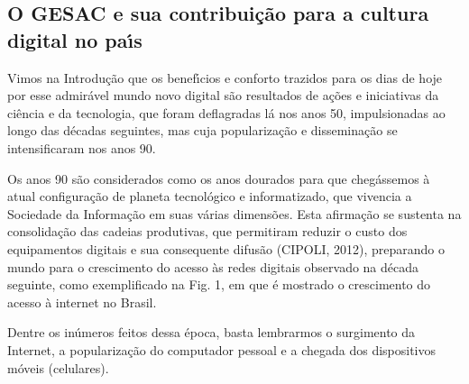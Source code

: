 \documentclass[
12pt,		%
openright,	%
twoside,  %
a4paper,			%
chapter=TITLE,		%
english,			%
french,				%
spanish,			%
brazil				%
]{USPSC-classe/USPSC}
\begin{document}
\subsection[O GESAC e sua contribui\c{c}\~ao para  a cultura  digital  no pa\'{\i}s]{O GESAC e sua contribui\c{c}\~ao para  a cultura  digital  no pa\'{\i}s}\label{O GESAC e sua contribui\c{c}\~ao para  a cultura  digital  no pa\'{\i}s}
Vimos na Introdu\c{c}\~ao que os benef\'{\i}cios e conforto trazidos para os dias de hoje por esse admir\'avel mundo novo digital s\~ao resultados de a\c{c}\~oes e iniciativas da ci\^encia e da tecnologia, que foram deflagradas l\'a nos anos 50, impulsionadas ao longo das d\'ecadas seguintes, mas cuja populariza\c{c}\~ao e dissemina\c{c}\~ao se intensificaram nos anos 90.

















Os anos 90 s\~ao considerados como os anos dourados para que cheg\'assemos \`a atual configura\c{c}\~ao de planeta tecnol\'ogico e informatizado, que vivencia a Sociedade da Informa\c{c}\~ao em suas v\'arias dimens\~oes. Esta afirma\c{c}\~ao se sustenta na consolida\c{c}\~ao das cadeias produtivas, que permitiram reduzir o custo dos equipamentos digitais e sua consequente difus\~ao (CIPOLI, 2012), preparando o mundo para o crescimento do acesso \`as redes digitais observado na d\'ecada seguinte, como exemplificado na Fig. 1, em que \'e mostrado o crescimento do acesso \`a internet no Brasil.

















Dentre os  in\'umeros feitos dessa \'epoca, basta lembrarmos o surgimento da Internet, a populariza\c{c}\~ao do computador pessoal e a chegada dos dispositivos m\'oveis (celulares).
\end{document}
